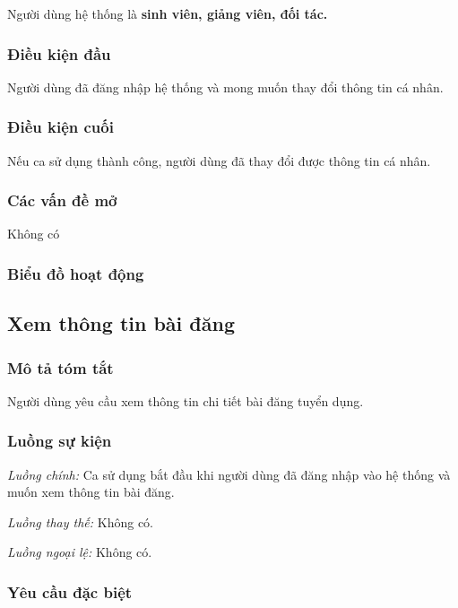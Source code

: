 \documentclass[./../main.tex]{subfiles}
\begin{document}
Người dùng hệ thống là \textbf{sinh viên, giảng viên, đối tác.}

\subsubsection*{Điều kiện đầu}

Người dùng đã đăng nhập hệ thống và mong muốn thay đổi thông tin cá
nhân.

\subsubsection*{Điều kiện cuối}

Nếu ca sử dụng thành công, người dùng đã thay đổi được thông tin cá
nhân.

\subsubsection*{Các vấn đề mở}

Không có

\subsubsection*{Biểu đồ hoạt động}

\subsection{Xem thông tin bài đăng}

\subsubsection*{Mô tả tóm tắt}

Người dùng yêu cầu xem thông tin chi tiết bài đăng tuyển dụng.

\subsubsection*{Luồng sự kiện}

\emph{Luồng chính:} Ca sử dụng bắt đầu khi người dùng đã đăng nhập vào
hệ thống và muốn xem thông tin bài đăng.

\emph{Luồng thay thế:} Không có.

\emph{Luồng ngoại lệ:} Không có.

\subsubsection*{Yêu cầu đặc biệt}
\end{document}
